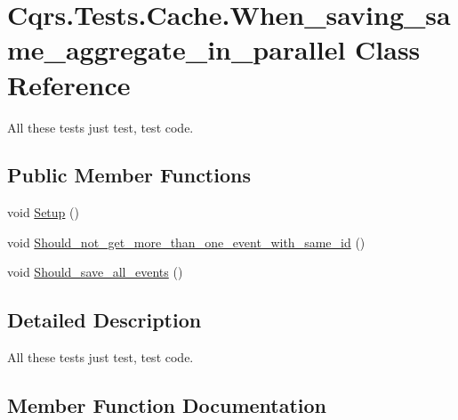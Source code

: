 \hypertarget{classCqrs_1_1Tests_1_1Cache_1_1When__saving__same__aggregate__in__parallel}{}\section{Cqrs.\+Tests.\+Cache.\+When\+\_\+saving\+\_\+same\+\_\+aggregate\+\_\+in\+\_\+parallel Class Reference}
\label{classCqrs_1_1Tests_1_1Cache_1_1When__saving__same__aggregate__in__parallel}


All these tests just test, test code.  


\subsection*{Public Member Functions}
\begin{DoxyCompactItemize}
\item 
void \hyperlink{classCqrs_1_1Tests_1_1Cache_1_1When__saving__same__aggregate__in__parallel_a890f63553517f7e3ad0c848f191adaed_a890f63553517f7e3ad0c848f191adaed}{Setup} ()
\item 
void \hyperlink{classCqrs_1_1Tests_1_1Cache_1_1When__saving__same__aggregate__in__parallel_a27a82cf373e64f46b3e8bb1fb065d2a1_a27a82cf373e64f46b3e8bb1fb065d2a1}{Should\+\_\+not\+\_\+get\+\_\+more\+\_\+than\+\_\+one\+\_\+event\+\_\+with\+\_\+same\+\_\+id} ()
\item 
void \hyperlink{classCqrs_1_1Tests_1_1Cache_1_1When__saving__same__aggregate__in__parallel_afcef550c102b327fdbd4d2a3f73786aa_afcef550c102b327fdbd4d2a3f73786aa}{Should\+\_\+save\+\_\+all\+\_\+events} ()
\end{DoxyCompactItemize}


\subsection{Detailed Description}
All these tests just test, test code. 



\subsection{Member Function Documentation}
\mbox{\label{classCqrs_1_1Tests_1_1Cache_1_1When__saving__same__aggregate__in__parallel_a890f63553517f7e3ad0c848f191adaed_a890f63553517f7e3ad0c848f191adaed}} 
